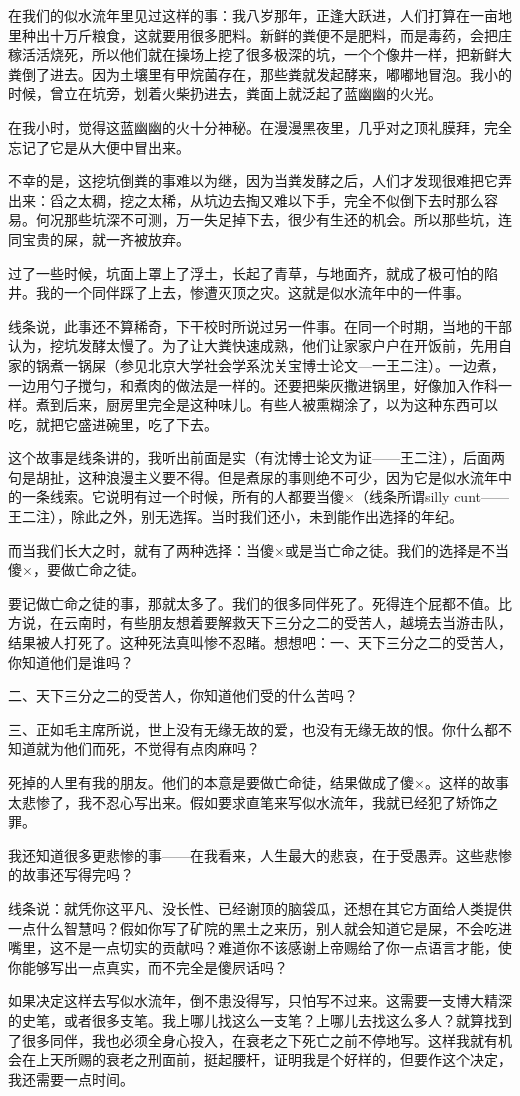 在我们的似水流年里见过这样的事：我八岁那年，正逢大跃进，人们打算在一亩地里种出十万斤粮食，这就要用很多肥料。新鲜的粪便不是肥料，而是毒药，会把庄稼活活烧死，所以他们就在操场上挖了很多极深的坑，一个个像井一样，把新鲜大粪倒了进去。因为土壤里有甲烷菌存在，那些粪就发起酵来，嘟嘟地冒泡。我小的时候，曾立在坑旁，划着火柴扔进去，粪面上就泛起了蓝幽幽的火光。 

在我小时，觉得这蓝幽幽的火十分神秘。在漫漫黑夜里，几乎对之顶礼膜拜，完全忘记了它是从大便中冒出来。 

不幸的是，这挖坑倒粪的事难以为继，因为当粪发酵之后，人们才发现很难把它弄出来：舀之太稠，挖之太稀，从坑边去掏又难以下手，完全不似倒下去时那么容易。何况那些坑深不可测，万一失足掉下去，很少有生还的机会。所以那些坑，连同宝贵的屎，就一齐被放弃。 

过了一些时候，坑面上罩上了浮土，长起了青草，与地面齐，就成了极可怕的陷井。我的一个同伴踩了上去，惨遭灭顶之灾。这就是似水流年中的一件事。 

线条说，此事还不算稀奇，下干校时所说过另一件事。在同一个时期，当地的干部认为，挖坑发酵太慢了。为了让大粪快速成熟，他们让家家户户在开饭前，先用自家的锅煮一锅屎（参见北京大学社会学系沈关宝博士论文—一王二注）。一边煮，一边用勺子搅匀，和煮肉的做法是一样的。还要把柴灰撒进锅里，好像加入作科一样。煮到后来，厨房里完全是这种味儿。有些人被熏糊涂了，以为这种东西可以吃，就把它盛进碗里，吃了下去。 

这个故事是线条讲的，我听出前面是实（有沈博士论文为证——王二注），后面两句是胡扯，这种浪漫主义要不得。但是煮尿的事则绝不可少，因为它是似水流年中的一条线索。它说明有过一个时候，所有的人都要当傻×（线条所谓silly cunt——王二注），除此之外，别无选挥。当时我们还小，未到能作出选择的年纪。 

而当我们长大之时，就有了两种选择：当傻×或是当亡命之徒。我们的选择是不当傻×，要做亡命之徒。 

要记做亡命之徒的事，那就太多了。我们的很多同伴死了。死得连个屁都不值。比方说，在云南时，有些朋友想着要解救天下三分之二的受苦人，越境去当游击队，结果被人打死了。这种死法真叫惨不忍睹。想想吧：一、天下三分之二的受苦人，你知道他们是谁吗？ 

二、天下三分之二的受苦人，你知道他们受的什么苦吗？ 

三、正如毛主席所说，世上没有无缘无故的爱，也没有无缘无故的恨。你什么都不知道就为他们而死，不觉得有点肉麻吗？ 

死掉的人里有我的朋友。他们的本意是要做亡命徒，结果做成了傻×。这样的故事太悲惨了，我不忍心写出来。假如要求直笔来写似水流年，我就已经犯了矫饰之罪。 

我还知道很多更悲惨的事——在我看来，人生最大的悲哀，在于受愚弄。这些悲惨的故事还写得完吗？ 

线条说：就凭你这平凡、没长性、已经谢顶的脑袋瓜，还想在其它方面给人类提供一点什么智慧吗？假如你写了矿院的黑土之来历，别人就会知道它是屎，不会吃进嘴里，这不是一点切实的贡献吗？难道你不该感谢上帝赐给了你一点语言才能，使你能够写出一点真实，而不完全是傻屄话吗？ 

如果决定这样去写似水流年，倒不患没得写，只怕写不过来。这需要一支博大精深的史笔，或者很多支笔。我上哪儿找这么一支笔？上哪儿去找这么多人？就算找到了很多同伴，我也必须全身心投入，在衰老之下死亡之前不停地写。这样我就有机会在上天所赐的衰老之刑面前，挺起腰杆，证明我是个好样的，但要作这个决定，我还需要一点时间。
